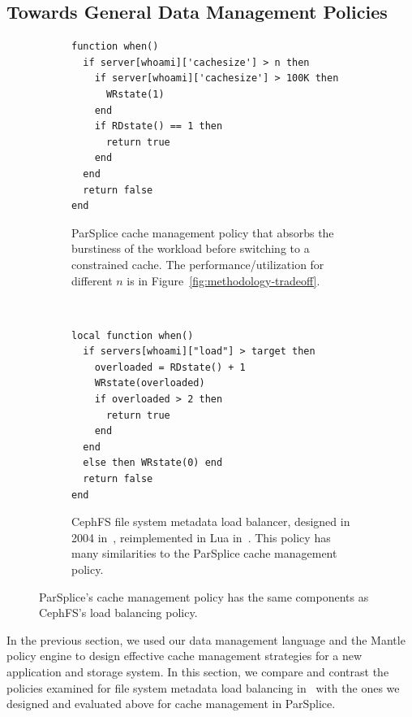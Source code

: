 \subsection{Towards General Data Management Policies}
\label{sec:scope}

\begin{figure}[t!]
    \centering
    \begin{subfigure}[t]{0.48\textwidth}
        \centering
        \footnotesize
        \centering
        \begin{verbatim}
function when()
  if server[whoami]['cachesize'] > n then
    if server[whoami]['cachesize'] > 100K then
      WRstate(1)
    end
    if RDstate() == 1 then
      return true
    end
  end
  return false
end
        \end{verbatim}
        \caption{ParSplice cache management policy that absorbs the burstiness of the
        workload before switching to a constrained cache.  The
        performance/utilization for different  \(n\) is in
        Figure~\ref{fig:methodology-tradeoff}. \label{src:lru-dyn}}
    \end{subfigure}%
    ~ 
    \begin{subfigure}[t]{0.48\textwidth}
        \centering
        \footnotesize
        \begin{verbatim}
local function when()
  if servers[whoami]["load"] > target then
    overloaded = RDstate() + 1
    WRstate(overloaded)
    if overloaded > 2 then
      return true
    end
  end
  else then WRstate(0) end
  return false
end
        \end{verbatim}
	\caption{CephFS file system metadata load balancer, designed in 2004
        in~\cite{weil:sc2004-dyn-metadata}, reimplemented in Lua
        in~\cite{sevilla:sc15-mantle}. This policy has many similarities to the
        ParSplice cache management policy.\label{src:lua-cephfs}}
    \end{subfigure}
    \caption{ParSplice's cache management policy has the same components as
    CephFS's load balancing policy.}
\end{figure}

In the previous section, we used our data management language and the Mantle
policy engine to design effective cache management strategies for a new
application and storage system. In this section, we compare and contrast the
policies examined for file system metadata load balancing
in~\cite{sevilla:sc15-mantle} with the ones we designed and evaluated above for
cache management in ParSplice. 

